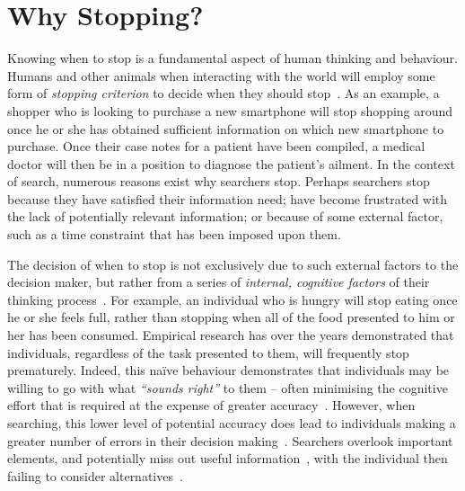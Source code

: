 \section{Why Stopping?}\label{sec:stopping_background:why}
Knowing when to stop is a fundamental aspect of human thinking and behaviour. Humans and other animals when interacting with the world will employ some form of \emph{stopping criterion} to decide when they should stop~\citep{nickles1995judgment}. As an example, a shopper who is looking to purchase a new smartphone will stop shopping around once he or she has obtained sufficient information on which new smartphone to purchase. Once their case notes for a patient have been compiled, a medical doctor will then be in a position to diagnose the patient's ailment. In the context of search, numerous reasons exist why searchers stop. Perhaps searchers stop because they have satisfied their information need; have become frustrated with the lack of potentially relevant information; or because of some external factor, such as a time constraint that has been imposed upon them.

The decision of when to stop is not exclusively due to such external factors to the decision maker, but rather from a series of \emph{internal, cognitive factors} of their thinking process~\citep{nickles1995judgment}. For example, an individual who is hungry will stop eating once he or she feels full, rather than stopping when all of the food presented to him or her has been consumed. Empirical research has over the years demonstrated that individuals, regardless of the task presented to them, will frequently stop prematurely. Indeed, this na\"{i}ve behaviour demonstrates that individuals may be willing to go with what \emph{``sounds right''} to them -- often minimising the cognitive effort that is required at the expense of greater accuracy~\citep{perkins1983difficulties}. However, when searching, this lower level of potential accuracy does lead to individuals making a greater number of errors in their decision making~\citep{baron1988heuristics}. Searchers overlook important elements, and potentially miss out useful information~\citep{fischhoff1977cost_benefit, fischhoff1978fault, shafir1992thinking}, with the individual then failing to consider alternatives~\citep{farquhar1993decision_structuring}.

